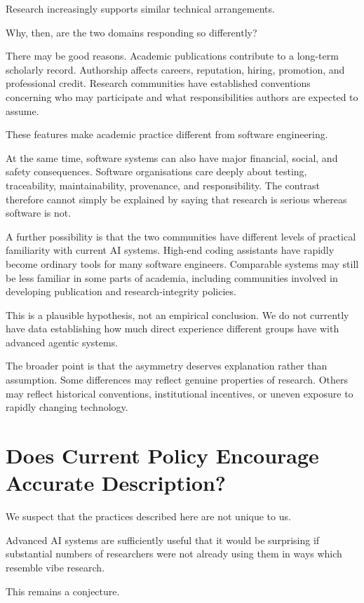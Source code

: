 Research increasingly supports similar technical arrangements.

Why, then, are the two domains responding so differently?

There may be good reasons. Academic publications contribute to a long-term scholarly record. Authorship affects careers, reputation, hiring, promotion, and professional credit. Research communities have established conventions concerning who may participate and what responsibilities authors are expected to assume.

These features make academic practice different from software engineering.

At the same time, software systems can also have major financial, social, and safety consequences. Software organisations care deeply about testing, traceability, maintainability, provenance, and responsibility. The contrast therefore cannot simply be explained by saying that research is serious whereas software is not.

A further possibility is that the two communities have different levels of practical familiarity with current AI systems. High-end coding assistants have rapidly become ordinary tools for many software engineers. Comparable systems may still be less familiar in some parts of academia, including communities involved in developing publication and research-integrity policies.

This is a plausible hypothesis, not an empirical conclusion. We do not currently have data establishing how much direct experience different groups have with advanced agentic systems.

The broader point is that the asymmetry deserves explanation rather than assumption. Some differences may reflect genuine properties of research. Others may reflect historical conventions, institutional incentives, or uneven exposure to rapidly changing technology.


\section{Does Current Policy Encourage Accurate Description?}

We suspect that the practices described here are not unique to us.

Advanced AI systems are sufficiently useful that it would be surprising if substantial numbers of researchers were not already using them in ways which resemble vibe research.

This remains a conjecture.

